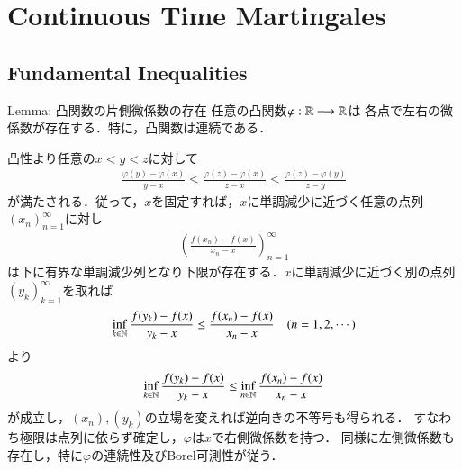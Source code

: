 \section{Continuous Time Martingales}
\subsection{Fundamental Inequalities}
	
	\begin{itembox}[l]{Lemma: 凸関数の片側微係数の存在}
		任意の凸関数$\varphi:\mathbb{R} \longrightarrow \mathbb{R}$は
		各点で左右の微係数が存在する．特に，凸関数は連続である．
	\end{itembox}
	
	\begin{prf}
		凸性より任意の$x < y < z$に対して
		\begin{align}
			\frac{\varphi(y) - \varphi(x)}{y - x} 
			\leq \frac{\varphi(z) - \varphi(x)}{z - x}
			\leq \frac{\varphi(z) - \varphi(y)}{z - y}
			\label{ineq:lem:convex_function_measurability_1}
		\end{align}
		が満たされる．従って，$x$を固定すれば，$x$に単調減少に近づく任意の点列$(x_n)_{n=1}^{\infty}$に対し
		 \begin{align}
		 	\left(\frac{f(x_n)-f(x)}{x_n-x}\right)_{n=1}^{\infty} 
		 	\label{seq:lem:convex_function_measurability_2}
		 \end{align}
		 は下に有界な単調減少列となり下限が存在する．$x$に単調減少に近づく別の点列$(y_k)_{k=1}^{\infty}$を取れば
		 \begin{align}
		 	\operatorname*{inf}_{k \in \mathbb{N}} \frac{f(y_k)-f(x)}{y_k-x} \leq \frac{f(x_n)-f(x)}{x_n-x} \quad (n=1,2,\cdots)
		 \end{align}
		 より
		 \begin{align}
		 	\operatorname*{inf}_{k \in \mathbb{N}} \frac{f(y_k)-f(x)}{y_k-x} \leq \operatorname*{inf}_{n \in \mathbb{N}} \frac{f(x_n)-f(x)}{x_n-x}
		 \end{align}
		 が成立し，$(x_n),(y_k)$の立場を変えれば逆向きの不等号も得られる．
		 すなわち極限は点列に依らず確定し，$\varphi$は$x$で右側微係数を持つ．
		 同様に左側微係数も存在し，特に$\varphi$の連続性及びBorel可測性が従う．
		 \QED
	\end{prf}
	
